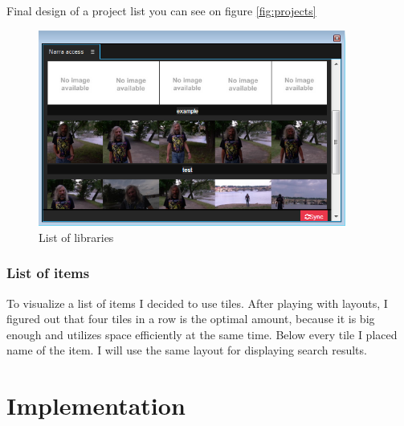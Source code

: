 \documentclass[thesis=B,english]{FITthesis}[2012/10/20]
\begin{document}
Final design of a project list you can see on figure \ref{fig:projects}
	\begin{figure}
		\centering
		\includegraphics[width=0.9\textwidth]{libraries.png}
		\caption{List of libraries}\label{fig:libraries}
	\end{figure}
\subsection{List of items}
To visualize a list of items I decided to use tiles. After playing with layouts, I figured out that four tiles in a row is the optimal amount, because it is big enough and utilizes space efficiently at the same time. Below every tile I placed name of the item. I will use the same layout for displaying search results.
\chapter{Implementation}
\end{document}
